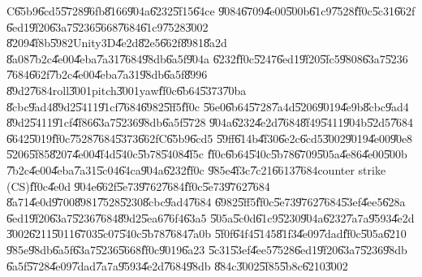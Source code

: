\begin{case}
C\U{65b9}\U{6cd5}\U{5728}\U{96fb}\U{8166}\U{904a}\U{6232}\U{5f15}\U{64ce}%
\U{9084}\U{6709}\U{4e00}\U{500b}\U{61c9}\U{7528}\U{ff0c}\U{5c31}\U{662f}%
\U{6ed1}\U{9f20}\U{63a7}\U{5236}\U{5668}\U{7684}\U{61c9}\U{7528}\U{3002}%
\U{8209}\U{4f8b}\U{5982}Unity3D\U{4e2d}\U{82e5}\U{662f}\U{8981}\U{8a2d}%
\U{8a08}\U{7b2c}\U{4e00}\U{4eba}\U{7a31}\U{7684}\U{98db}\U{6a5f}\U{904a}%
\U{6232}\U{ff0c}\U{5247}\U{6ed1}\U{9f20}\U{5fc5}\U{9808}\U{63a7}\U{5236}%
\U{7684}\U{662f}\U{7b2c}\U{4e00}\U{4eba}\U{7a31}\U{98db}\U{6a5f}\U{8996}%
\U{89d2}\U{7684}roll\U{3001}pitch\U{3001}yaw\U{ff0c}\U{6b64}\U{5373}\U{70ba}%
\U{8cbc}\U{9ad4}\U{89d2}\U{5411}\U{91cf}\U{7684}\U{6982}\U{5ff5}\U{ff0c}%
\U{56e0}\U{6b64}\U{5728}\U{7a4d}\U{5206}\U{9019}\U{4e9b}\U{8cbc}\U{9ad4}%
\U{89d2}\U{5411}\U{91cf}\U{4f86}\U{63a7}\U{5236}\U{98db}\U{6a5f}\U{5728}%
\U{904a}\U{6232}\U{4e2d}\U{7684}\U{8f49}\U{5411}\U{904b}\U{52d5}\U{7684}%
\U{6642}\U{5019}\U{ff0c}\U{7528}\U{7684}\U{5373}\U{662f}C\U{65b9}\U{6cd5}%
\U{59ff}\U{614b}\U{4f30}\U{6e2c}\U{6cd5}\U{3002}\U{9019}\U{4e00}\U{90e8}%
\U{5206}\U{5f85}\U{8207}\U{4e00}\U{4f4d}\U{540c}\U{5b78}\U{5408}\U{4f5c}%
\U{ff0c}\U{6b64}\U{540c}\U{5b78}\U{6709}\U{505a}\U{4e86}\U{4e00}\U{500b}%
\U{7b2c}\U{4e00}\U{4eba}\U{7a31}\U{5c04}\U{64ca}\U{904a}\U{6232}\U{ff0c}%
\U{985e}\U{4f3c}\U{7c21}\U{6613}\U{7684}counter strike (CS)\U{ff0c}\U{4e0d}%
\U{904e}\U{662f}\U{5e73}\U{9762}\U{7684}\U{ff0c}\U{5e73}\U{9762}\U{7684}%
\U{8a71}\U{4e0d}\U{9700}\U{8981}\U{7528}\U{5230}\U{8cbc}\U{9ad4}\U{7684}%
\U{6982}\U{5ff5}\U{ff0c}\U{5e73}\U{9762}\U{7684}\U{53ef}\U{4ee5}\U{628a}%
\U{6ed1}\U{9f20}\U{63a7}\U{5236}\U{7684}\U{89d2}\U{5ea6}\U{76f4}\U{63a5}%
\U{505a}\U{5c0d}\U{61c9}\U{5230}\U{904a}\U{6232}\U{7a7a}\U{9593}\U{4e2d}%
\U{3002}\U{6211}\U{5011}\U{6703}\U{5c07}\U{540c}\U{5b78}\U{7684}\U{7a0b}%
\U{5f0f}\U{64f4}\U{5145}\U{81f3}\U{4e09}\U{7dad}\U{ff0c}\U{505a}\U{6210}%
\U{985e}\U{98db}\U{6a5f}\U{63a7}\U{5236}\U{5668}\U{ff0c}\U{9019}\U{6a23}%
\U{5c31}\U{53ef}\U{4ee5}\U{7528}\U{6ed1}\U{9f20}\U{63a7}\U{5236}\U{98db}%
\U{6a5f}\U{5728}\U{4e09}\U{7dad}\U{7a7a}\U{9593}\U{4e2d}\U{7684}\U{98db}%
\U{884c}\U{3002}\U{5f85}\U{5b8c}\U{6210}\U{3002}
\end{case}

\clearpage%

